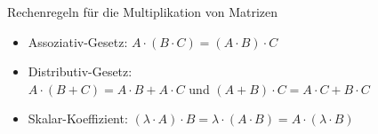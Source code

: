     \begin{theorem}{Rechenregeln für die Multiplikation von Matrizen}
        \begin{itemize}
            \item Assoziativ-Gesetz: $A\cdot(B\cdot C)=(A\cdot B)\cdot C$
            \item Distributiv-Gesetz: \\
                $A\cdot(B+C)=A\cdot B+A\cdot C$ und $(A+B)\cdot C=A\cdot C+B\cdot C$
            \item Skalar-Koeffizient: $(\lambda\cdot A)\cdot B=\lambda\cdot (A\cdot B)=A\cdot(\lambda\cdot B)$
        \end{itemize}
    \end{theorem}

